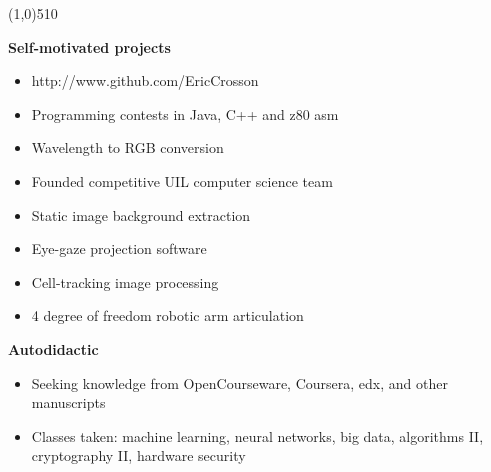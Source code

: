 \documentclass{report}
\newcommand{\cut}{\begin{center} \line(1,0){510} \end{center}}
\begin{document}
\cut{}

\textbf{Self-motivated projects}
\begin{paracol}{2}

  \begin{itemize}[label=$\circ$]
  \item http://www.github.com/EricCrosson
  \item Programming contests in Java, C++ and z80 asm
  \item Wavelength to RGB conversion
  \item Founded competitive UIL computer science team
  \end{itemize}

  \switchcolumn{}
  \begin{itemize}[label=$\circ$]
  \item Static image background extraction
  \item Eye-gaze projection software
  \item Cell-tracking image processing
  \item 4 degree of freedom robotic arm articulation
  \end{itemize}
\end{paracol}

\textbf{Autodidactic}
\begin{itemize}[label=$\circ$]
\item Seeking knowledge from OpenCourseware, Coursera, edx, and other manuscripts
\item Classes taken: machine learning, neural networks, big data, algorithms II,
  cryptography II, hardware security
\end{itemize}


\end{document}
